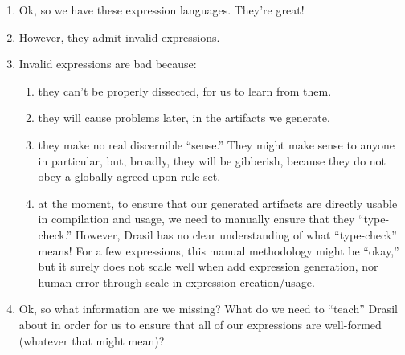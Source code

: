 
\begin{enumerate}

      \item Ok, so we have these expression languages. They're great!

      \item However, they admit invalid expressions.

      \item Invalid expressions are bad because:

            \begin{enumerate}

                  \item they can't be properly dissected, for us to learn from
                        them.

                  \item they will cause problems later, in the artifacts we
                        generate.

                  \item they make no real discernible ``sense.'' They might make
                        sense to anyone in particular, but, broadly, they will
                        be gibberish, because they do not obey a globally agreed
                        upon rule set.

                  \item at the moment, to ensure that our generated artifacts
                        are directly usable in compilation and usage, we need to
                        manually ensure that they ``type-check.'' However,
                        Drasil has no clear understanding of what ``type-check''
                        means! For a few expressions, this manual methodology
                        might be ``okay,'' but it surely does not scale well
                        when add expression generation, nor human error through
                        scale in expression creation/usage.

            \end{enumerate}

      \item Ok, so what information are we missing? What do we need to ``teach''
            Drasil about in order for us to ensure that all of our expressions
            are well-formed (whatever that might mean)?

            \begin{enumerate}


\end{enumerate}
\end{enumerate}

